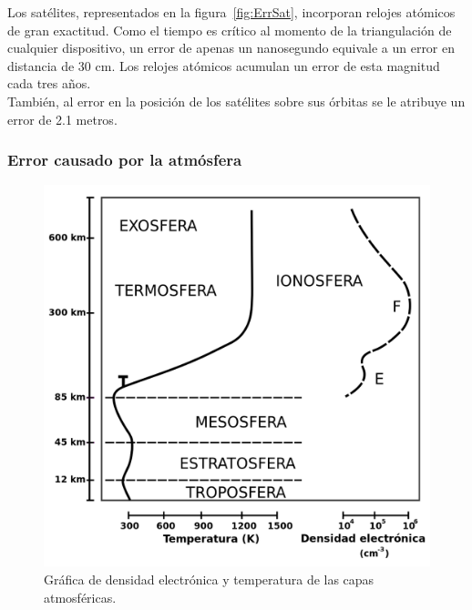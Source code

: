
Los satélites, representados en la figura~\ref{fig:ErrSat}, incorporan relojes atómicos de gran exactitud. Como el tiempo es crítico al momento de la triangulación de cualquier dispositivo, un error de apenas un nanosegundo equivale a un error en distancia de 30 cm. Los relojes atómicos acumulan un error de esta magnitud cada tres años. \\

También, al error en la posición de los satélites sobre sus órbitas se le atribuye un error de 2.1 metros.

\subsubsection{Error causado por la atmósfera}

\begin{figure}[H]
\centering
\includegraphics[scale=0.4]{Figures/GraficaErrAtm}
\caption[Error por capas de la Atmósfera.]{Gráfica de densidad electrónica y temperatura de las capas atmosféricas\footnotemark.}
\label{fig:ErrGAtm}
\end{figure}


